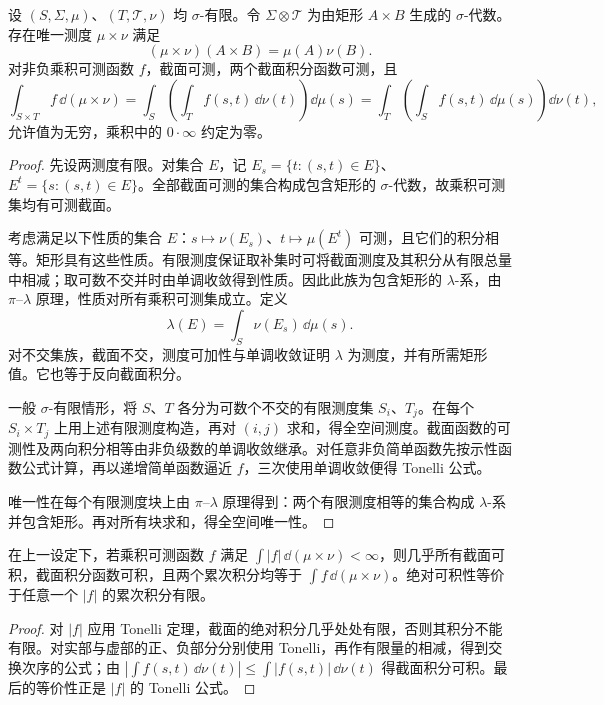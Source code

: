 \begin{theorem}\label{thm:y0-tonelli}
设 $(S,\Sigma,\mu)$、$(T,\mathcal T,\nu)$ 均 $\sigma$-有限。令 $\Sigma\otimes\mathcal T$ 为由矩形 $A\times B$ 生成的 $\sigma$-代数。存在唯一测度 $\mu\times\nu$ 满足
\[
 (\mu\times\nu)(A\times B)=\mu(A)\nu(B).
\]
对非负乘积可测函数 $f$，截面可测，两个截面积分函数可测，且
\[
 \int_{S\times T}f\,\dd(\mu\times\nu)
 =\int_S\left(\int_Tf(s,t)\,\dd\nu(t)\right)\dd\mu(s)
 =\int_T\left(\int_Sf(s,t)\,\dd\mu(s)\right)\dd\nu(t),
\]
允许值为无穷，乘积中的 $0\cdot\infty$ 约定为零。
\end{theorem}
\begin{proof}
先设两测度有限。对集合 $E$，记 $E_s=\{t:(s,t)\in E\}$、$E^t=\{s:(s,t)\in E\}$。全部截面可测的集合构成包含矩形的 $\sigma$-代数，故乘积可测集均有可测截面。

考虑满足以下性质的集合 $E$：$s\mapsto\nu(E_s)$、$t\mapsto\mu(E^t)$ 可测，且它们的积分相等。矩形具有这些性质。有限测度保证取补集时可将截面测度及其积分从有限总量中相减；取可数不交并时由单调收敛得到性质。因此此族为包含矩形的 $\lambda$-系，由 $\pi$--$\lambda$ 原理，性质对所有乘积可测集成立。定义
\[
 \lambda(E)=\int_S\nu(E_s)\,\dd\mu(s).
\]
对不交集族，截面不交，测度可加性与单调收敛证明 $\lambda$ 为测度，并有所需矩形值。它也等于反向截面积分。

一般 $\sigma$-有限情形，将 $S$、$T$ 各分为可数个不交的有限测度集 $S_i$、$T_j$。在每个 $S_i\times T_j$ 上用上述有限测度构造，再对 $(i,j)$ 求和，得全空间测度。截面函数的可测性及两向积分相等由非负级数的单调收敛继承。对任意非负简单函数先按示性函数公式计算，再以递增简单函数逼近 $f$，三次使用单调收敛便得 Tonelli 公式。

唯一性在每个有限测度块上由 $\pi$--$\lambda$ 原理得到：两个有限测度相等的集合构成 $\lambda$-系并包含矩形。再对所有块求和，得全空间唯一性。
\end{proof}

\begin{theorem}[Fubini 定理]\label{thm:y0-fubini}
在上一设定下，若乘积可测函数 $f$ 满足 $\int|f|\,\dd(\mu\times\nu)<\infty$，则几乎所有截面可积，截面积分函数可积，且两个累次积分均等于 $\int f\,\dd(\mu\times\nu)$。绝对可积性等价于任意一个 $|f|$ 的累次积分有限。
\end{theorem}
\begin{proof}
对 $|f|$ 应用 Tonelli 定理，截面的绝对积分几乎处处有限，否则其积分不能有限。对实部与虚部的正、负部分分别使用 Tonelli，再作有限量的相减，得到交换次序的公式；由 $|\int f(s,t)\,\dd\nu(t)|\le\int|f(s,t)|\,\dd\nu(t)$ 得截面积分可积。最后的等价性正是 $|f|$ 的 Tonelli 公式。
\end{proof}

